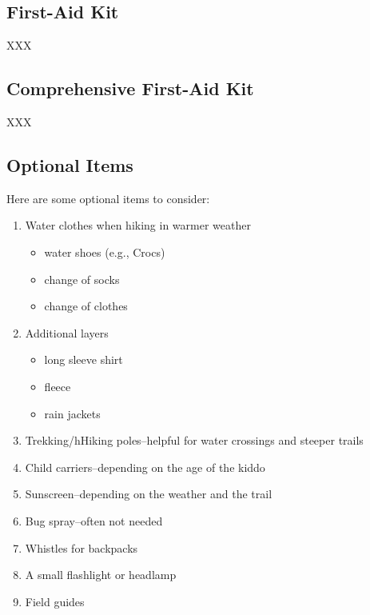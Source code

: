 \documentclass[
  letterpaper,
  DIV=11,
  numbers=noendperiod]{scrreprt}
\providecommand{\tightlist}{%
  \setlength{\itemsep}{0pt}\setlength{\parskip}{0pt}}\usepackage{longtable,booktabs,array}
\begin{document}
\subsection{First-Aid Kit}\label{first-aid-kit}

XXX

\subsection{Comprehensive First-Aid
Kit}\label{comprehensive-first-aid-kit}

XXX

\subsection{Optional Items}\label{optional-items}

Here are some optional items to consider:

\begin{enumerate}
\def\labelenumi{\arabic{enumi}.}
\tightlist
\item
  Water clothes when hiking in warmer weather

  \begin{itemize}
  \tightlist
  \item
    water shoes (e.g., Crocs)
  \item
    change of socks
  \item
    change of clothes
  \end{itemize}
\item
  Additional layers

  \begin{itemize}
  \tightlist
  \item
    long sleeve shirt
  \item
    fleece
  \item
    rain jackets
  \end{itemize}
\item
  Trekking/hHiking poles--helpful for water crossings and steeper trails
\item
  Child carriers--depending on the age of the kiddo
\item
  Sunscreen--depending on the weather and the trail
\item
  Bug spray--often not needed
\item
  Whistles for backpacks
\item
  A small flashlight or headlamp
\item
  Field guides
\end{enumerate}
\end{document}
